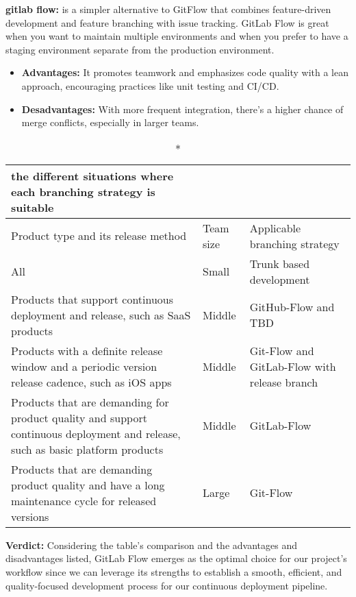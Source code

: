 \textbf{gitlab flow:} is a simpler alternative to GitFlow that combines feature-driven development and feature branching with issue tracking. GitLab Flow is great when you want to maintain multiple environments and when you prefer to have a staging environment separate from the production environment.
\begin{itemize}
    \item \textbf{Advantages:} It promotes teamwork and emphasizes code quality with a lean approach, encouraging practices like unit testing and CI/CD.
    \item \textbf{Desadvantages:} With more frequent integration, there's a higher chance of merge conflicts, especially in larger teams.
\end{itemize}
\begin{longtable}[c]{
    |p{}
    |p{}|
    p{}|
    }
    \caption*{the different situations where each branching strategy is suitable}
    \label{tab:gitStratagyTable}
    \\ \hline

    Product type and its release method                                                                                            & Team size & Applicable branching strategy                \\ \hline
    All                                                                                                                            & Small     & Trunk based development                      \\ \hline
    Products that support continuous deployment and release, such as SaaS products                                                 & Middle    & GitHub-Flow and TBD                          \\ \hline
    Products with a definite release window and a periodic version release cadence, such as iOS apps                               & Middle    & Git-Flow and GitLab-Flow with release branch \\ \hline
    Products that are demanding for product quality and support continuous deployment and release, such as basic platform products & Middle    & GitLab-Flow                                  \\ \hline
    Products that are demanding product quality and have a long maintenance cycle for released versions                            & Large     & Git-Flow                                     \\ \hline
\end{longtable}
\par
\textbf{Verdict:} Considering the table's comparison and the advantages and disadvantages listed, GitLab Flow emerges as the optimal choice for our project's workflow since we can leverage its strengths to establish a smooth, efficient, and quality-focused development process for our continuous deployment pipeline.
